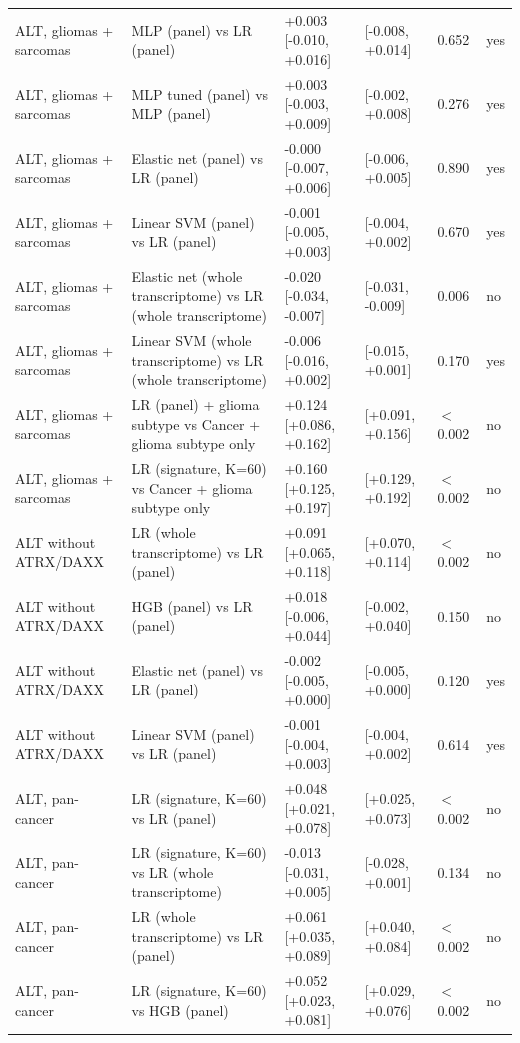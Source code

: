 \begin{longtable}{@{}>{\raggedright\arraybackslash}p{}>{\raggedright\arraybackslash}p{}p{}p{}p{}p{}@{}}
ALT, gliomas + sarcomas & MLP (panel) vs LR (panel) & +0.003 [-0.010, +0.016] & [-0.008, +0.014] & 0.652 & yes \\
ALT, gliomas + sarcomas & MLP tuned (panel) vs MLP (panel) & +0.003 [-0.003, +0.009] & [-0.002, +0.008] & 0.276 & yes \\
ALT, gliomas + sarcomas & Elastic net (panel) vs LR (panel) & -0.000 [-0.007, +0.006] & [-0.006, +0.005] & 0.890 & yes \\
ALT, gliomas + sarcomas & Linear SVM (panel) vs LR (panel) & -0.001 [-0.005, +0.003] & [-0.004, +0.002] & 0.670 & yes \\
ALT, gliomas + sarcomas & Elastic net (whole transcriptome) vs LR (whole transcriptome) & -0.020 [-0.034, -0.007] & [-0.031, -0.009] & 0.006 & no \\
ALT, gliomas + sarcomas & Linear SVM (whole transcriptome) vs LR (whole transcriptome) & -0.006 [-0.016, +0.002] & [-0.015, +0.001] & 0.170 & yes \\
ALT, gliomas + sarcomas & LR (panel) + glioma subtype vs Cancer + glioma subtype only & +0.124 [+0.086, +0.162] & [+0.091, +0.156] & $<$0.002 & no \\
ALT, gliomas + sarcomas & LR (signature, K=60) vs Cancer + glioma subtype only & +0.160 [+0.125, +0.197] & [+0.129, +0.192] & $<$0.002 & no \\
ALT without ATRX/DAXX & LR (whole transcriptome) vs LR (panel) & +0.091 [+0.065, +0.118] & [+0.070, +0.114] & $<$0.002 & no \\
ALT without ATRX/DAXX & HGB (panel) vs LR (panel) & +0.018 [-0.006, +0.044] & [-0.002, +0.040] & 0.150 & no \\
ALT without ATRX/DAXX & Elastic net (panel) vs LR (panel) & -0.002 [-0.005, +0.000] & [-0.005, +0.000] & 0.120 & yes \\
ALT without ATRX/DAXX & Linear SVM (panel) vs LR (panel) & -0.001 [-0.004, +0.003] & [-0.004, +0.002] & 0.614 & yes \\
ALT, pan-cancer & LR (signature, K=60) vs LR (panel) & +0.048 [+0.021, +0.078] & [+0.025, +0.073] & $<$0.002 & no \\
ALT, pan-cancer & LR (signature, K=60) vs LR (whole transcriptome) & -0.013 [-0.031, +0.005] & [-0.028, +0.001] & 0.134 & no \\
ALT, pan-cancer & LR (whole transcriptome) vs LR (panel) & +0.061 [+0.035, +0.089] & [+0.040, +0.084] & $<$0.002 & no \\
ALT, pan-cancer & LR (signature, K=60) vs HGB (panel) & +0.052 [+0.023, +0.081] & [+0.029, +0.076] & $<$0.002 & no \\

\end{longtable}
